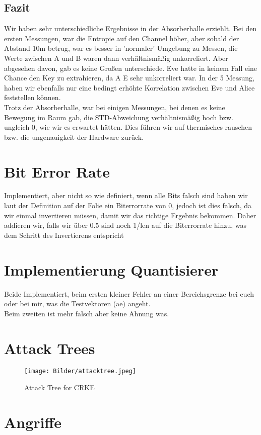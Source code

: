 \documentclass[12pt,a4paper]{article}
\begin{document}
\subsection*{Fazit}
Wir haben sehr unterschiedliche Ergebnisse in der Absorberhalle erziehlt. Bei den ersten Messungen, war die Entropie auf den Channel höher, aber sobald der Abstand 10m betrug, war es besser in 'normaler' Umgebung zu Messen, die Werte zwischen A und B waren dann verhältnismäßig unkorreliert. Aber abgesehen davon, gab es keine Großen unterschiede. Eve hatte in keinem Fall eine Chance den Key zu extrahieren, da A E sehr unkorreliert war. In der 5 Messung, haben wir ebenfalls nur eine bedingt erhöhte Korrelation zwischen Eve und Alice feststellen können.\\
Trotz der Absorberhalle, war bei einigen Messungen, bei denen es keine Bewegung im Raum gab, die STD-Abweichung verhältnismäßig hoch bzw. ungleich 0, wie wir es erwartet hätten. Dies führen wir auf thermisches rauschen bzw. die ungenauigkeit der Hardware zurück.
\clearpage
\section{Bit Error Rate}
Implementiert, aber nicht so wie definiert, wenn alle Bits falsch sind haben wir laut der Definition auf der Folie ein Biterrorrate von 0, jedoch ist dies falsch, da wir einmal invertieren müssen, damit wir das richtige Ergebnis bekommen. Daher addieren wir, falls wir über 0.5 sind noch 1/len auf die Biterrorrate hinzu, was dem Schritt des Invertierens entspricht
\section{Implementierung Quantisierer}
Beide Implementiert, beim ersten kleiner Fehler an einer Bereichsgrenze bei euch oder bei mir, was die Testvektoren (ae) angeht.\\
Beim zweiten ist mehr falsch aber keine Ahnung was.
\section{Attack Trees}
\begin{figure}[H]
\centering
\texttt{[image: Bilder/attacktree.jpeg]}
\caption{Attack Tree for CRKE}
\label{test7}
\end{figure}
\section{Angriffe}
\end{document}
